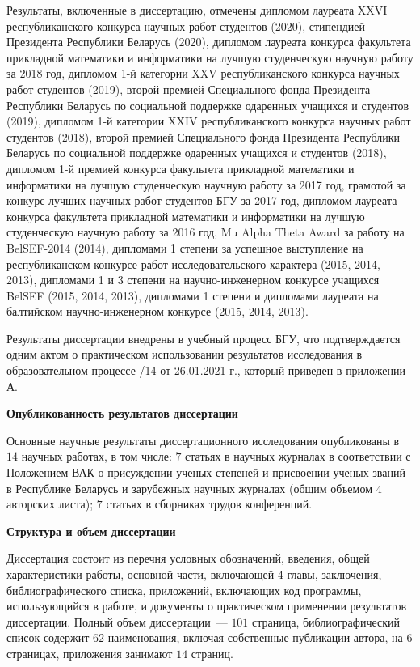 \documentclass[_00_autoref.tex]{subfiles}
\begin{document}
Результаты, включенные в диссертацию, отмечены дипломом лауреата XXVI республиканского конкурса научных работ студентов (2020), стипендией Президента Республики Беларусь (2020), дипломом лауреата конкурса факультета прикладной математики и информатики на лучшую студенческую научную работу за 2018 год, дипломом 1-й категории XXV республиканского конкурса научных работ студентов (2019), второй премией Специального фонда Президента Республики Беларусь по социальной поддержке одаренных учащихся и студентов (2019), дипломом 1-й категории XXIV республиканского конкурса научных работ студентов (2018), второй премией Специального фонда Президента Республики Беларусь по социальной поддержке одаренных учащихся и студентов (2018), дипломом 1-й премией конкурса факультета прикладной математики и информатики на лучшую студенческую научную работу за 2017 год, грамотой за конкурс лучших научных работ студентов БГУ за 2017 год, дипломом лауреата конкурса факультета прикладной математики и информатики на лучшую студенческую научную работу за 2016 год, Mu Alpha Theta Award за работу на BelSEF-2014 (2014), дипломами 1 степени за успешное выступление на республиканском конкурсе работ исследовательского характера (2015, 2014, 2013), дипломами 1 и 3 степени на научно-инженерном конкурсе учащихся BelSEF (2015, 2014, 2013), дипломами 1 степени и дипломами лауреата на балтийском научно-инженерном конкурсе (2015, 2014, 2013).

Результаты диссертации внедрены в учебный процесс БГУ, что подтверждается одним актом о практическом использовании результатов исследования в образовательном процессе /14 от 26.01.2021 г., который приведен в приложении А.

\medskip
\centerline{\textbf{Опубликованность результатов диссертации}}

Основные научные результаты диссертационного исследования опубликованы в $14$ научных работах, в том числе: $7$ статьях в научных журналах в соответствии с Положением ВАК о присуждении ученых степеней и присвоении ученых званий в Республике Беларусь и зарубежных научных журналах (общим объемом $4$ авторских листа); $7$ статьях в сборниках трудов конференций.

\medskip
\centerline{\textbf{Структура и объем диссертации}}

Диссертация состоит из перечня условных обозначений, введения, общей характеристики работы, основной части, включающей $4$ главы, заключения, библиографического списка, приложений, включающих код программы, использующийся в работе, и документы о практическом применении результатов диссертации.
Полный объем диссертации~--- $101$ страница, библиографический список содержит $62$ наименования, включая собственные публикации автора, на $6$ страницах, приложения занимают $14$ страниц.
\end{document}

